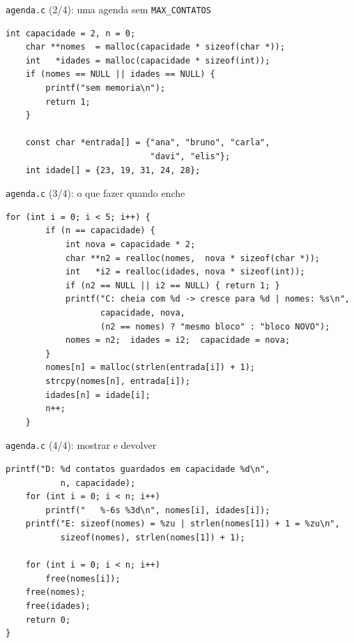 \documentclass[aspectratio=169]{beamer}
\begin{document}
\begin{frame}[fragile]{\texttt{agenda.c} (2/4): uma agenda sem \texttt{MAX\_CONTATOS}}
\begin{lstlisting}[basicstyle=\ttfamily\scriptsize, firstnumber=18]
    int capacidade = 2, n = 0;
    char **nomes  = malloc(capacidade * sizeof(char *));
    int   *idades = malloc(capacidade * sizeof(int));
    if (nomes == NULL || idades == NULL) {
        printf("sem memoria\n");
        return 1;
    }

    const char *entrada[] = {"ana", "bruno", "carla",
                             "davi", "elis"};
    int idade[] = {23, 19, 31, 24, 28};
\end{lstlisting}
\end{frame}

\begin{frame}[fragile]{\texttt{agenda.c} (3/4): o que fazer quando enche}
\begin{lstlisting}[basicstyle=\ttfamily\scriptsize, firstnumber=30]
    for (int i = 0; i < 5; i++) {
        if (n == capacidade) {
            int nova = capacidade * 2;
            char **n2 = realloc(nomes,  nova * sizeof(char *));
            int   *i2 = realloc(idades, nova * sizeof(int));
            if (n2 == NULL || i2 == NULL) { return 1; }
            printf("C: cheia com %d -> cresce para %d | nomes: %s\n",
                   capacidade, nova,
                   (n2 == nomes) ? "mesmo bloco" : "bloco NOVO");
            nomes = n2;  idades = i2;  capacidade = nova;
        }
        nomes[n] = malloc(strlen(entrada[i]) + 1);
        strcpy(nomes[n], entrada[i]);
        idades[n] = idade[i];
        n++;
    }
\end{lstlisting}
\end{frame}

\begin{frame}[fragile]{\texttt{agenda.c} (4/4): mostrar e devolver}
\begin{lstlisting}[basicstyle=\ttfamily\scriptsize, firstnumber=47]
    printf("D: %d contatos guardados em capacidade %d\n",
           n, capacidade);
    for (int i = 0; i < n; i++)
        printf("   %-6s %3d\n", nomes[i], idades[i]);
    printf("E: sizeof(nomes) = %zu | strlen(nomes[1]) + 1 = %zu\n",
           sizeof(nomes), strlen(nomes[1]) + 1);

    for (int i = 0; i < n; i++)
        free(nomes[i]);
    free(nomes);
    free(idades);
    return 0;
}
\end{lstlisting}
\end{frame}
\end{document}
